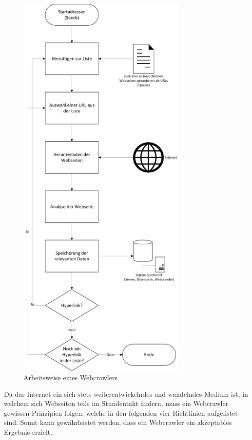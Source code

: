 \begin{figure}[H]
	\centering
	\includegraphics[width=8.45cm]{img/flussdiagramm-ablauf-webcrawler-neu.png}
	\caption{Arbeitsweise eines Webcrawlers}
	\label{fig:arbeitsweise_crawler}
\end{figure}
Da das Internet ein sich stets weiterentwickelndes und wandelndes Medium ist, in welchem sich Webseiten teils im Stundentakt ändern, muss ein Webcrawler gewissen Prinzipien folgen, welche in den folgenden vier Richtlinien aufgelistet sind.\cite[265-267]{ijcsc-web-crawler-overview} Somit kann gewährleistet werden, dass ein Webcrawler ein akzeptables Ergebnis erzielt.
